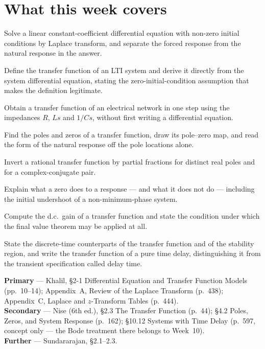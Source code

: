 \documentclass[11pt,a4paper]{article}
\begin{document}
\weektitle

\section*{What this week covers}

\begin{outcomes}
\item Solve a linear constant-coefficient differential equation with non-zero
      initial conditions by Laplace transform, and separate the forced response
      from the natural response in the answer.
\item Define the transfer function of an LTI system and derive it directly from
      the system differential equation, stating the zero-initial-condition
      assumption that makes the definition legitimate.
\item Obtain a transfer function of an electrical network in one step using
      the impedances $R$, $Ls$ and $1/Cs$, without first writing a differential
      equation.
\item Find the poles and zeros of a transfer function, draw its pole--zero map,
      and read the form of the natural response off the pole locations alone.
\item Invert a rational transfer function by partial fractions for distinct
      real poles and for a complex-conjugate pair.
\item Explain what a zero does to a response --- and what it does not do ---
      including the initial undershoot of a non-minimum-phase system.
\item Compute the d.c.\ gain of a transfer function and state the condition
      under which the final value theorem may be applied at all.
\item State the discrete-time counterparts of the transfer function and of the
      stability region, and write the transfer function of a pure time delay,
      distinguishing it from the transient specification called delay time.
\end{outcomes}

\begin{readingbox}
\textbf{Primary} --- Khalil, \S2-1 Differential Equation and Transfer Function
Models (pp.~10--14); Appendix~A, Review of the Laplace Transform (p.~438);
Appendix~C, Laplace and $z$-Transform Tables (p.~444).\\
\textbf{Secondary} --- Nise (6th ed.), \S2.3 The Transfer Function (p.~44);
\S4.2 Poles, Zeros, and System Response (p.~162); \S10.12 Systems with Time
Delay (p.~597, concept only --- the Bode treatment there belongs to Week~10).\\
\textbf{Further} --- Sundararajan, \S2.1--2.3.
\end{readingbox}
\end{document}
